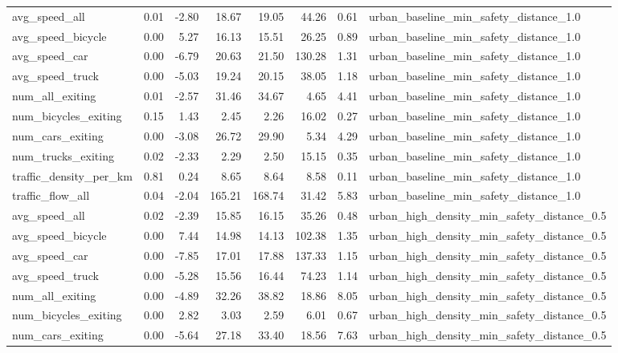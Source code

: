 \begin{table}[ht]
\begin{tabular}{lrrrrrrl}
  avg\_speed\_all & 0.01 & -2.80 & 18.67 & 19.05 & 44.26 & 0.61 & urban\_baseline\_min\_safety\_distance\_1.0 \\ 
  avg\_speed\_bicycle & 0.00 & 5.27 & 16.13 & 15.51 & 26.25 & 0.89 & urban\_baseline\_min\_safety\_distance\_1.0 \\ 
  avg\_speed\_car & 0.00 & -6.79 & 20.63 & 21.50 & 130.28 & 1.31 & urban\_baseline\_min\_safety\_distance\_1.0 \\ 
  avg\_speed\_truck & 0.00 & -5.03 & 19.24 & 20.15 & 38.05 & 1.18 & urban\_baseline\_min\_safety\_distance\_1.0 \\ 
  num\_all\_exiting & 0.01 & -2.57 & 31.46 & 34.67 & 4.65 & 4.41 & urban\_baseline\_min\_safety\_distance\_1.0 \\ 
  num\_bicycles\_exiting & 0.15 & 1.43 & 2.45 & 2.26 & 16.02 & 0.27 & urban\_baseline\_min\_safety\_distance\_1.0 \\ 
  num\_cars\_exiting & 0.00 & -3.08 & 26.72 & 29.90 & 5.34 & 4.29 & urban\_baseline\_min\_safety\_distance\_1.0 \\ 
  num\_trucks\_exiting & 0.02 & -2.33 & 2.29 & 2.50 & 15.15 & 0.35 & urban\_baseline\_min\_safety\_distance\_1.0 \\ 
  traffic\_density\_per\_km & 0.81 & 0.24 & 8.65 & 8.64 & 8.58 & 0.11 & urban\_baseline\_min\_safety\_distance\_1.0 \\ 
  traffic\_flow\_all & 0.04 & -2.04 & 165.21 & 168.74 & 31.42 & 5.83 & urban\_baseline\_min\_safety\_distance\_1.0 \\ 
  avg\_speed\_all & 0.02 & -2.39 & 15.85 & 16.15 & 35.26 & 0.48 & urban\_high\_density\_min\_safety\_distance\_0.5 \\ 
  avg\_speed\_bicycle & 0.00 & 7.44 & 14.98 & 14.13 & 102.38 & 1.35 & urban\_high\_density\_min\_safety\_distance\_0.5 \\ 
  avg\_speed\_car & 0.00 & -7.85 & 17.01 & 17.88 & 137.33 & 1.15 & urban\_high\_density\_min\_safety\_distance\_0.5 \\ 
  avg\_speed\_truck & 0.00 & -5.28 & 15.56 & 16.44 & 74.23 & 1.14 & urban\_high\_density\_min\_safety\_distance\_0.5 \\ 
  num\_all\_exiting & 0.00 & -4.89 & 32.26 & 38.82 & 18.86 & 8.05 & urban\_high\_density\_min\_safety\_distance\_0.5 \\ 
  num\_bicycles\_exiting & 0.00 & 2.82 & 3.03 & 2.59 & 6.01 & 0.67 & urban\_high\_density\_min\_safety\_distance\_0.5 \\ 
  num\_cars\_exiting & 0.00 & -5.64 & 27.18 & 33.40 & 18.56 & 7.63 & urban\_high\_density\_min\_safety\_distance\_0.5 \\ 

\end{tabular}
\end{table}
